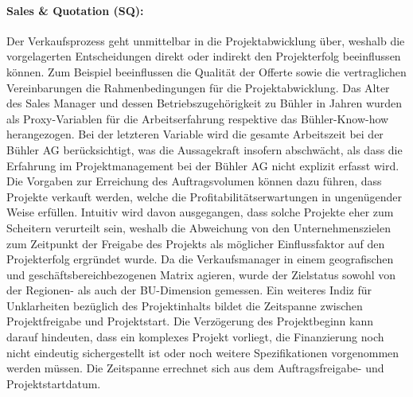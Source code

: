 \paragraph{Sales \& Quotation (SQ):} Der Verkaufsprozess geht unmittelbar in die Projektabwicklung über, weshalb die vorgelagerten Entscheidungen direkt oder indirekt den Projekterfolg beeinflussen können. Zum Beispiel beeinflussen die Qualität der Offerte sowie die vertraglichen Vereinbarungen die Rahmenbedingungen für die Projektabwicklung. Das Alter des Sales Manager und dessen Betriebszugehörigkeit zu Bühler in Jahren wurden als Proxy-Variablen für die Arbeitserfahrung respektive das Bühler-Know-how herangezogen. Bei der letzteren Variable wird die gesamte Arbeitszeit bei der Bühler AG berücksichtigt, was die Aussagekraft insofern abschwächt, als dass die Erfahrung im Projektmanagement bei der Bühler AG nicht explizit erfasst wird. Die Vorgaben zur Erreichung des Auftragsvolumen können dazu führen, dass Projekte verkauft werden, welche die Profitabilitätserwartungen in ungenügender Weise erfüllen. Intuitiv wird davon ausgegangen, dass solche Projekte eher zum Scheitern verurteilt sein, weshalb die Abweichung von den Unternehmenszielen zum Zeitpunkt der Freigabe des Projekts als möglicher Einflussfaktor auf den Projekterfolg ergründet wurde. Da die Verkaufsmanager in einem geografischen und geschäftsbereichbezogenen Matrix agieren, wurde der Zielstatus sowohl von der Regionen- als auch der BU-Dimension gemessen. Ein weiteres Indiz für Unklarheiten bezüglich des Projektinhalts bildet die Zeitspanne zwischen Projektfreigabe und Projektstart. Die Verzögerung des Projektbeginn kann darauf hindeuten, dass ein komplexes Projekt vorliegt, die Finanzierung noch nicht eindeutig sichergestellt ist oder noch weitere Spezifikationen vorgenommen werden müssen. Die Zeitspanne errechnet sich aus dem Auftragsfreigabe- und Projektstartdatum.
